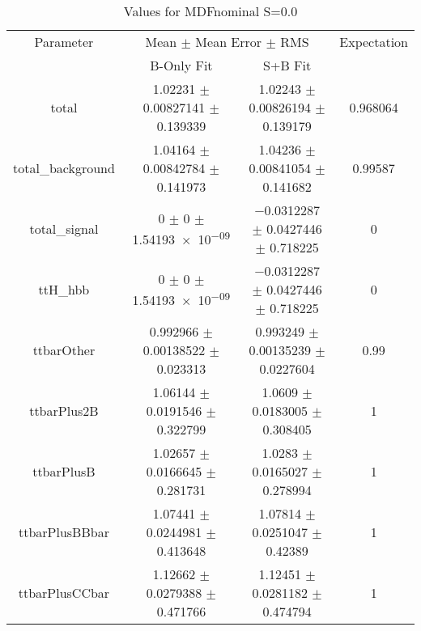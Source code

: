\begin{table}
\centering
\caption{Values for MDFnominal S=0.0}
\begin{tabular}{cccc}
\toprule
Parameter & \multicolumn{2}{c}{Mean $\pm$ Mean Error $\pm$ RMS} & Expectation\\
 & B-Only Fit & S+B Fit & \\
\midrule
total & \num{1.02231} $\pm$ \num{0.00827141} $\pm$ \num{0.139339} & \num{1.02243} $\pm$ \num{0.00826194} $\pm$ \num{0.139179} & \num{0.968064}\\
total\_background & \num{1.04164} $\pm$ \num{0.00842784} $\pm$ \num{0.141973} & \num{1.04236} $\pm$ \num{0.00841054} $\pm$ \num{0.141682} & \num{0.99587}\\
total\_signal & \num{0} $\pm$ \num{0} $\pm$ \num{1.54193e-09} & \num{-0.0312287} $\pm$ \num{0.0427446} $\pm$ \num{0.718225} & \num{0}\\
ttH\_hbb & \num{0} $\pm$ \num{0} $\pm$ \num{1.54193e-09} & \num{-0.0312287} $\pm$ \num{0.0427446} $\pm$ \num{0.718225} & \num{0}\\
ttbarOther & \num{0.992966} $\pm$ \num{0.00138522} $\pm$ \num{0.023313} & \num{0.993249} $\pm$ \num{0.00135239} $\pm$ \num{0.0227604} & \num{0.99}\\
ttbarPlus2B & \num{1.06144} $\pm$ \num{0.0191546} $\pm$ \num{0.322799} & \num{1.0609} $\pm$ \num{0.0183005} $\pm$ \num{0.308405} & \num{1}\\
ttbarPlusB & \num{1.02657} $\pm$ \num{0.0166645} $\pm$ \num{0.281731} & \num{1.0283} $\pm$ \num{0.0165027} $\pm$ \num{0.278994} & \num{1}\\
ttbarPlusBBbar & \num{1.07441} $\pm$ \num{0.0244981} $\pm$ \num{0.413648} & \num{1.07814} $\pm$ \num{0.0251047} $\pm$ \num{0.42389} & \num{1}\\
ttbarPlusCCbar & \num{1.12662} $\pm$ \num{0.0279388} $\pm$ \num{0.471766} & \num{1.12451} $\pm$ \num{0.0281182} $\pm$ \num{0.474794} & \num{1}\\
\bottomrule
\end{tabular}
\end{table}